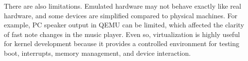 There are also limitations. Emulated hardware may not behave exactly like real hardware, and some devices are simplified compared to physical machines. For example, PC speaker output in QEMU can be limited, which affected the clarity of fast note changes in the music player. Even so, virtualization is highly useful for kernel development because it provides a controlled environment for testing boot, interrupts, memory management, and device interaction\cite{qemuPcMachine, hashnodeVMboot}.